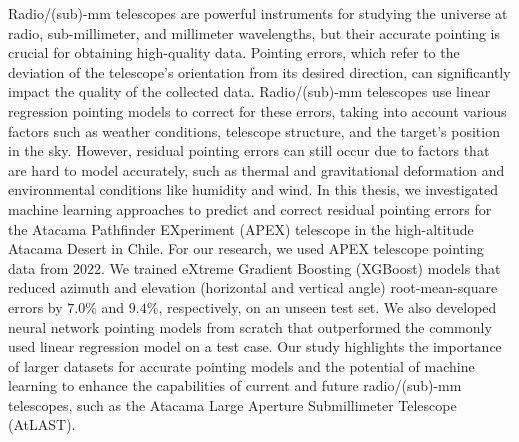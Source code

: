 

Radio/(sub)-mm telescopes are powerful instruments for studying the universe at radio, sub-millimeter, and millimeter wavelengths, but their accurate pointing is crucial for obtaining high-quality data.
Pointing errors, which refer to the deviation of the telescope's orientation from its desired direction, can significantly impact the quality of the collected data.
Radio/(sub)-mm telescopes use linear regression pointing models to correct for these errors, taking into account various factors such as weather conditions, telescope structure, and the target's position in the sky.
However, residual pointing errors can still occur due to factors that are hard to model accurately, such as thermal and gravitational deformation and environmental conditions like humidity and wind.
In this thesis, we investigated machine learning approaches to predict and correct residual pointing errors for the Atacama Pathfinder EXperiment (APEX) telescope in the high-altitude Atacama Desert in Chile.
For our research, we used APEX telescope pointing data from $2022$.
We trained eXtreme Gradient Boosting (XGBoost) models that reduced azimuth and elevation (horizontal and vertical angle) root-mean-square errors by $7.0\%$ and $9.4\%$,
respectively, on an unseen test set. We also developed neural network pointing models from scratch that outperformed the commonly used linear regression model on a test case.
Our study highlights the importance of larger datasets for accurate pointing models and the potential of machine learning to enhance the capabilities of current and future radio/(sub)-mm telescopes,
such as the Atacama Large Aperture Submillimeter Telescope (AtLAST).


